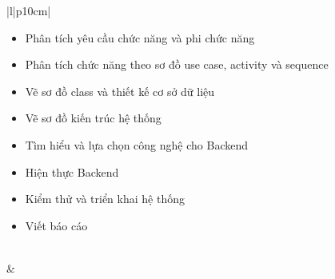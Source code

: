 \begin{table}[H]
\begin{tabular}{|l|p{10cm}|}
\begin{minipage}[t]{\linewidth}
\begin{itemize}
			\item Phân tích yêu cầu chức năng và phi chức năng
			\item Phân tích chức năng theo sơ đồ use case, activity và sequence
			\item Vẽ sơ đồ class và thiết kế cơ sở dữ liệu
			\item Vẽ sơ đồ kiến trúc hệ thống
			\item Tìm hiểu và lựa chọn công nghệ cho Backend
			\item Hiện thực Backend
			\item Kiểm thử và triển khai hệ thống
			\item Viết báo cáo
		\end{itemize}
	\end{minipage} \\
	&\\
	\hline
	\end{tabular}
	\end{table}
	
